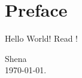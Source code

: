 \documentclass[a4paper,12pt]{article}
\begin{document}
\section*{Preface}
Hello World! Read \cite{author:title}!

\begin{flushright}
    Shena \\
    \today.
\end{flushright}
\end{document}
